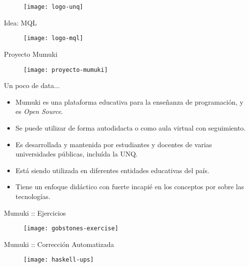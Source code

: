 \documentclass{beamer}
\begin{document}
\begin{frame}[plain]
    \vspace{2em}
    \titlepage
    \vspace{-2em}
    \begin{figure}[h]
        \texttt{[image: logo-unq]}
    \end{figure}
\end{frame}


\begin{frame}{Idea: MQL}
    \begin{figure}[h]
        \texttt{[image: logo-mql]}
    \end{figure}
\end{frame}


\begin{frame}{Proyecto Mumuki}
    \begin{figure}[h]
        \texttt{[image: proyecto-mumuki]}
    \end{figure}
\end{frame}


\begin{frame}{Un poco de data...}
    \begin{itemize}%
        \item Mumuki es una plataforma educativa para la enseñanza de programación, y es \textit{Open Source}.
        \item Se puede utilizar de forma autodidacta o como aula virtual con seguimiento.
        \item Es desarrollada y mantenida por estudiantes y docentes de varias universidades públicas, incluída la UNQ.
        \item Está siendo utilizada en diferentes entidades educativas del país.
        \item Tiene un enfoque didáctico con fuerte incapié en los conceptos por sobre las tecnologías.
    \end{itemize}
\end{frame}


\begin{frame}{Mumuki :: Ejercicios}
    \begin{figure}[h]
        \texttt{[image: gobstones-exercise]}
    \end{figure}
\end{frame}

\begin{frame}{Mumuki :: Corrección Automatizada}
    \begin{figure}[h]
        \texttt{[image: haskell-ups]}
    \end{figure}
\end{frame}
\end{document}
